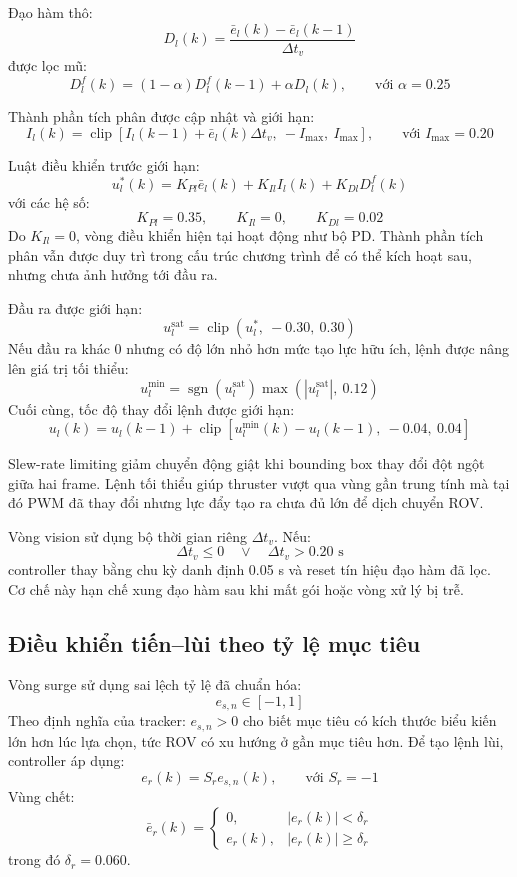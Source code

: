 \documentclass[../DoAn.tex]{subfiles}
\begin{document}
Đạo hàm thô:
\[
D_l(k) = \frac{\bar{e}_l(k)-\bar{e}_l(k-1)}{\Delta t_v}
\]
được lọc mũ:
\[
D_l^f(k) = (1-\alpha)D_l^f(k-1) + \alpha D_l(k), \qquad \text{với } \alpha = 0.25
\]

Thành phần tích phân được cập nhật và giới hạn:
\[
I_l(k) = \operatorname{clip}\left[ I_l(k-1)+\bar{e}_l(k)\Delta t_v,\ -I_{\max},\ I_{\max} \right], \qquad \text{với } I_{\max} = 0.20
\]

Luật điều khiển trước giới hạn:
\[
u_l^{*}(k) = K_{Pl}\bar{e}_l(k) + K_{Il}I_l(k) + K_{Dl}D_l^f(k)
\]
với các hệ số:
\[
K_{Pl} = 0.35, \qquad K_{Il} = 0, \qquad K_{Dl} = 0.02
\]
Do $K_{Il} = 0$, vòng điều khiển hiện tại hoạt động như bộ PD. Thành phần tích phân vẫn được duy trì trong cấu trúc chương trình để có thể kích hoạt sau, nhưng chưa ảnh hưởng tới đầu ra.

Đầu ra được giới hạn:
\[
u_l^{\mathrm{sat}} = \operatorname{clip}\left(u_l^{*},\ -0.30,\ 0.30\right)
\]
Nếu đầu ra khác 0 nhưng có độ lớn nhỏ hơn mức tạo lực hữu ích, lệnh được nâng lên giá trị tối thiểu:
\[
u_l^{\min} = \operatorname{sgn}\left(u_l^{\mathrm{sat}}\right)\max\left(|u_l^{\mathrm{sat}}|,\ 0.12\right)
\]
Cuối cùng, tốc độ thay đổi lệnh được giới hạn:
\[
u_l(k) = u_l(k-1) + \operatorname{clip}\left[ u_l^{\min}(k)-u_l(k-1),\ -0.04,\ 0.04 \right]
\]

Slew-rate limiting giảm chuyển động giật khi bounding box thay đổi đột ngột giữa hai frame. Lệnh tối thiểu giúp thruster vượt qua vùng gần trung tính mà tại đó PWM đã thay đổi nhưng lực đẩy tạo ra chưa đủ lớn để dịch chuyển ROV.

Vòng vision sử dụng bộ thời gian riêng $\Delta t_v$. Nếu:
\[
\Delta t_v \leq 0 \quad \lor \quad \Delta t_v > 0.20\text{ s}
\]
controller thay bằng chu kỳ danh định 0.05 s và reset tín hiệu đạo hàm đã lọc. Cơ chế này hạn chế xung đạo hàm sau khi mất gói hoặc vòng xử lý bị trễ.

\subsection{Điều khiển tiến--lùi theo tỷ lệ mục tiêu}

Vòng surge sử dụng sai lệch tỷ lệ đã chuẩn hóa:
\[
e_{s,n} \in [-1, 1]
\]
Theo định nghĩa của tracker: $e_{s,n} > 0$ cho biết mục tiêu có kích thước biểu kiến lớn hơn lúc lựa chọn, tức ROV có xu hướng ở gần mục tiêu hơn. Để tạo lệnh lùi, controller áp dụng:
\[
e_r(k) = S_r e_{s,n}(k), \qquad \text{với } S_r = -1
\]
Vùng chết:
\[
\bar{e}_r(k) = 
\begin{cases}
0, & |e_r(k)| < \delta_r \\
e_r(k), & |e_r(k)| \geq \delta_r
\end{cases}
\]
trong đó $\delta_r = 0.060$.
\end{document}
